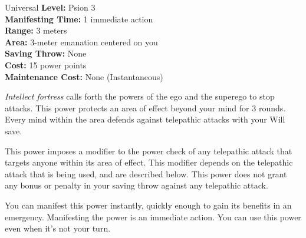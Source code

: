{Universal}
{
	\textbf{Level:}
	Psion 3\\
	\textbf{Manifesting Time:}
	1 immediate action\\
	\textbf{Range:}
	3 meters\\
	\textbf{Area:}
	3-meter emanation centered on you\\
	\textbf{Saving Throw:}
	None\\
	\textbf{Cost:}
	15 power points\\
	\textbf{Maintenance Cost:}
	None (Instantaneous)\\
}
{
	\emph{Intellect fortress} calls forth the powers of the ego and the superego to stop attacks. This power protects an area of effect beyond your mind for 3 rounds. Every mind within the area defends against telepathic attacks with your Will save.

	This power imposes a modifier to the power check of any telepathic attack that targets anyone within its area of effect. This modifier depends on the telepathic attack that is being used, and are described below. This power does not grant any bonus or penalty in your saving throw against any telepathic attack.


	You can manifest this power instantly, quickly enough to gain its benefits in an emergency. Manifesting the power is an immediate action. You can use this power even when it's not your turn.
}